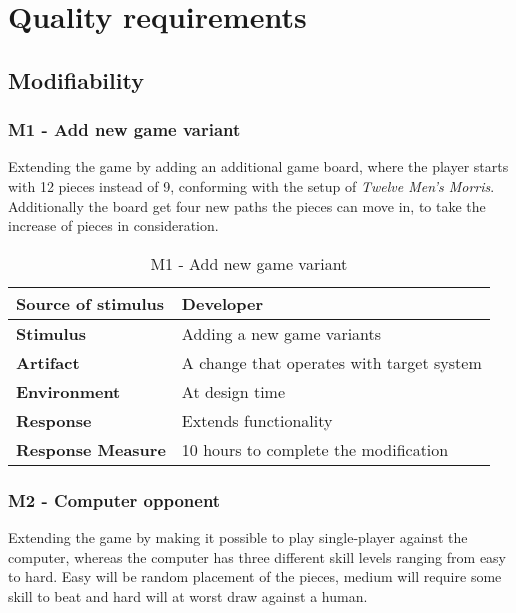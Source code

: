 \newpage

\section{Quality requirements}

\subsection{Modifiability}

\subsubsection{M1 - Add new game variant}

Extending the game by adding an additional game board, where the player starts with 12 pieces instead of 9, conforming with the setup of \emph{Twelve Men's Morris}. Additionally the board get four new paths the pieces can move in, to take the increase of pieces in consideration.

\begin{table}[h!]
\begin{tabular}{ | p{110pt} | p{250pt}  |}
\hline
\bf Source of stimulus &  Developer  \\ \hline
\bf Stimulus & Adding a new game variants \\ \hline 
\bf Artifact & A change that operates with target system  \\  \hline
\bf Environment & At design time \\ \hline
\bf Response & Extends functionality \\ \hline
\bf Response Measure & 10 hours to complete the modification \\ \hline

\end{tabular}
\caption{M1 - Add new game variant}
\end{table}

\subsubsection{M2 - Computer opponent}

Extending the game by making it possible to play single-player against the computer, whereas the computer has three different skill levels ranging from easy to hard. Easy will be random placement of the pieces, medium will require some skill to beat and hard will at worst draw against a human.

